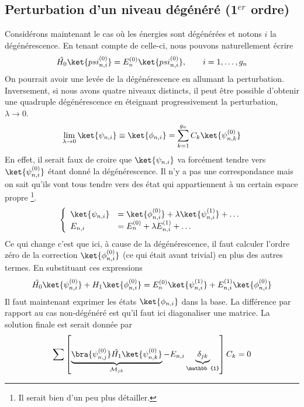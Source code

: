 	\subsection{Perturbation d'un niveau dégénéré (1$^{er}$ ordre)}
	Considérons maintenant le cas où les énergies sont dégénérées et notons $i$ la 
	dégénérescence. En tenant compte de celle-ci, nous pouvons naturellement écrire
	\begin{equation}
	\hat{H_0}\ket{psi_{n,i}^{(0)}} = E_n^{(0)}\ket{psi_{n,i}^{(0)}},\qquad i=1,\dots, g_n
	\end{equation}
	On pourrait avoir une levée de la dégénérescence en allumant la 
	perturbation. Inversement, si nous avons quatre niveaux distincts, il peut être possible 
	d'obtenir une quadruple dégénérescence en éteignant progressivement la perturbation, 
	$\lambda\to 0$.
	\begin{equation}
	\lim\limits_{\lambda\to 0} \ket{\psi_{n,i}} \equiv \ket{\phi_{n,i}} = \sum_{k=1}^{g_n} C_k 
	\ket{\psi_{n,k}^{(0)}}
	\end{equation}
	En effet, il serait faux de croire que $\ket{\psi_{n,i}}$ va forcément tendre vers 
	$\ket{\psi_{n,i}^{(0)}}$ étant donné la dégénérescence. Il n'y a pas une correspondance 
	mais on sait qu'ils vont tous tendre vers des état qui appartiennent à un certain espace propre
	\footnote{Il serait bien d'un peu plus détailler.}. 
	\begin{equation}
	\left\{\begin{array}{ll}
	\ket{\psi_{n,i}} &= \ket{\phi_{n,i}^{(0)}} + \lambda\ket{\psi_{n,i}^{(1)}} + \dots\\
	E_{n,i} &= E_n^{(0)} + \lambda E_{n,i}^{(1)} + \dots
	\end{array}\right.
	\end{equation}
	Ce qui change c'est que ici, à cause de la dégénérescence, il faut calculer l'ordre
	zéro de la correction $\ket{\phi_{n,i}^{(0)}}$ (ce qui était avant trivial) en plus 
	des autres termes. En substituant ces expressions
	\begin{equation}
	\hat{H_0}\ket{\psi_{n,i}^{(0)}} + H_1\ket{\phi_{n,i}^{(0)}} = E_n^{(0)}\ket{\psi_{n,i}^{
	(1)}} + E_{n,i}^{(1)}\ket{\phi_{n,i}^{(0)}}
	\end{equation}		
	Il faut maintenant exprimer les états $\ket{\phi_{n,i}}$ dans la base. La différence par 
	rapport au cas non-dégénéré est qu'il faut ici diagonaliser une matrice. La solution finale
	est serait donnée par
	\begin{equation}
	\sum\left[\underbrace{\bra{\psi_{n,j}^{(0)}}\hat{H_1}\ket{\psi_{n,k}^{(0)}}}_{\mathcal{M}_{jk}}-
	E_{n,i}\underbrace{\delta_{jk}}_{\mathbb{1}}\right]C_k=0
	\end{equation}
